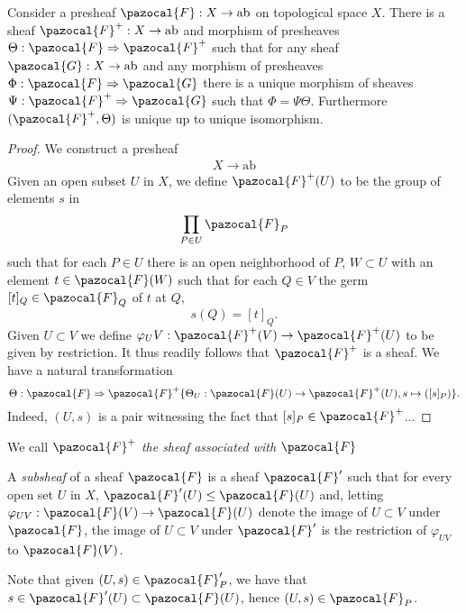 \begin{lemma}
    Consider a presheaf $\pazocal{F}:X\rightarrow \mathrm{ab}$ on topological space $X$. There is a sheaf $\pazocal{F}^{+}: X\rightarrow \mathrm{ab}$ and morphism of presheaves $\Theta : \pazocal{F}\Rightarrow\pazocal{F}^{+}$ such that for any sheaf $\pazocal{G}:X\rightarrow \mathrm{ab}$ and any morphism of presheaves $\Phi : \pazocal{F} \Rightarrow \pazocal{G}$ there is a unique morphism of sheaves $\Psi : \pazocal{F}^{+}\Rightarrow \pazocal{G}$ such that $\Phi = \Psi \Theta$. Furthermore $(\pazocal{F}^{+},\Theta)$ is unique up to unique isomorphism. 
\end{lemma}
\begin{proof}
    We construct a presheaf
    \begin{gather*}
        X\rightarrow \mathrm{ab}
    \end{gather*}
    Given an open subset $U$ in $X$, we define $\pazocal{F}^{+}(U)$ to be the group of elements $s$ in 
    $$\prod_{P\in U} \pazocal{F}_P$$
    such that for each $P\in U$ there is an open neighborhood of $P$, $W\subset U$ with an element $t\in \pazocal{F}(W)$ such that for each $Q\in V$ the germ $[t]_Q\in \pazocal{F}_Q$ of $t$ at $Q$,
    $$s(Q) = [t]_Q.$$
    Given $U\subset V$ we define $\varphi_UV : \pazocal{F}^{+}(V)\rightarrow \pazocal{F}^{+}(U)$ to be given by restriction. It thus readily follows that $\pazocal{F}^{+}$ is a sheaf. We have a natural transformation
    $$
        \Theta : \pazocal{F}\Rightarrow \pazocal{F}^{+}\\
        \{\Theta_U : \pazocal{F}(U)\rightarrow \pazocal{F}^{+}(U), s \mapsto ([s]_P)\}.
    $$
    Indeed, $(U,s)$ is a pair witnessing the fact that $[s]_P\in \pazocal{F}^{+}$...
\end{proof}
\begin{remark}
    We call $\pazocal{F}^{+}$ \emph{the sheaf associated with $\pazocal{F}$}
\end{remark}
\begin{definition}
    A \emph{subsheaf} of a sheaf $\pazocal{F}$ is a sheaf $\pazocal{F}'$ such that for every open set $U$ in $X$, $\pazocal{F}'(U)\leq \pazocal{F}(U)$ and, letting $\varphi_{UV}:\pazocal{F}(V)\rightarrow \pazocal{F}(U)$ denote the image of $U\subset V$ under $\pazocal{F}$, the image of $U\subset V$ under $\pazocal{F}'$ is the restriction of $\varphi_{UV}$ to $\pazocal{F}(V)$.
\end{definition}
\begin{remark}
    Note that given $(U,s)\in \pazocal{F}'_P$, we have that $s\in \pazocal{F}'(U)\subset \pazocal{F}(U)$, hence $(U,s)\in \pazocal{F}_P$. 
\end{remark}
